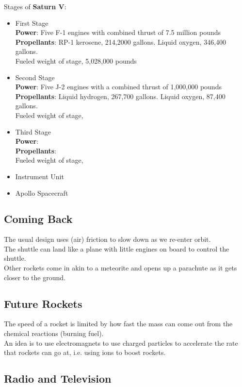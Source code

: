\documentclass[12pt]{article}
\theoremstyle{definition}
\begin{document}
Stages of \textbf{Saturn V}:
\begin{itemize}
    \item First Stage \\
    \textbf{Power}: Five F-1 engines with combined thrust of 7.5 million pounds \\
    \textbf{Propellants}: RP-1 kerosene, 214,2000 gallons. Liquid oxygen, 346,400 gallons. \\
    Fueled weight of stage, 5,028,000 pounds

    \item Second Stage \\
    \textbf{Power}: Five J-2 engines with a combined thrust of 1,000,000 pounds \\
    \textbf{Propellants}: Liquid hydrogen, 267,700 gallons. Liquid oxygen, 87,400 gallons. \\
    Fueled weight of stage,

    \item Third Stage \\
    \textbf{Power}:  \\
    \textbf{Propellants}:  \\
    Fueled weight of stage,

    \item Instrument Unit

    \item Apollo Spacecraft
\end{itemize}

\subsection{Coming Back}
The usual design uses (air) friction to slow down as we re-enter orbit. \\
The shuttle can land like a plane with little engines on board to control the shuttle. \\
Other rockets come in akin to a meteorite and opens up a parachute as it gets closer to the ground.

\subsection{Future Rockets}
The speed of a rocket is limited by how fast the mass can come out from the chemical reactions (burning fuel). \\
An idea is to use electromagnets to use charged particles to accelerate the rate that rockets can go at, i.e. using ions to boost rockets.

\subsection{Radio and Television}

\clearpage
\printindex
\end{document}
